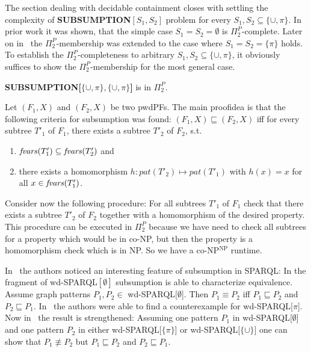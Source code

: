 The section dealing with decidable containment closes with settling the
complexity of \textbf{SUBSUMPTION$[S_1,S_2]$} problem for every $S_1, S_2 \subseteq \{
\cup, \pi \}$. In prior work \cite{letelier2012static} it was shown, that the simple case
$S_1=S_2=\emptyset$ is $\Pi_2^P$-complete. 
Later on in~\cite{letelier2013static} the $\Pi^P_2$-membership 
was extended to the case where $S_1 = S_2 = \{\pi\}$ holds.
To establish the $\Pi^P_2$-completeness to arbitrary $S_1,S_2 \subseteq \{ \cup,
\pi \}$, it obviously suffices to show the $\Pi_2^P$-membership for the most general case.

\begin{theorem}\label{scuppicuppi}
	\textbf{SUBSUMPTION[$\{\cup,\pi\}, \{ \cup, \pi \}$]} is in $\Pi^P_2$.
\end{theorem}
\begin{proofidea}
	Let $(F_1,X)$ and $(F_2,X)$ be two pwdPFs.
	The main proofidea is that the following criteria for subsumption was found:
	$(F_1,X) \sqsubseteq (F_2,X)$ iff for every subtree $T'_1$ of $F_1$, there
	exists a subtree $T'_2$ of $F_2$, s.t.
	\begin{enumerate}
		\item $\mathit{fvars}(T'_1) \subseteq \mathit{fvars}(T'_2)$ and
		\item there exists a homomorphism $h:pat(T'_2) \mapsto pat(T'_1)$
			with $h(x)= x$ for all $x \in \mathit{fvars}(T_1')$.
	\end{enumerate}
	Consider now the following procedure:
	For all subtrees $T'_1$ of $F_1$ check that there exists a subtree $T'_2$ of
	$F_2$ together with a homomorphism of the desired property. This procedure
	can be executed in $\Pi_2^P$ because we have need to check all subtrees
	for a property which would be in co-NP, but then the property is a
	homomorphism check which is in NP. So we have a co-NP$^{\mbox{NP}}$ runtime.
\end{proofidea}

In~\cite{letelier2012static} the authors noticed an interesting feature of
subsumption in SPARQL: In the fragment of wd-SPARQL$[\emptyset]$ subsumption is
able to characterize equivalence. Assume graph patterns $P_1,P_2 \in$
wd-SPARQL[$\emptyset$]. Then $P_1 \equiv P_2$ iff $P_1 \sqsubseteq P_2$ and 
$P_2 \sqsubseteq P_1$. In~\cite{letelier2013static} the authors were able to
find a counterexample for wd-SPARQL[$\pi$]. 
Now in~\cite{pichler2014containment} the result is strengthened:
Assuming one pattern $P_1$ in wd-SPARQL[$\emptyset$] and one pattern $P_2$ in either
wd-SPARQL[$\{\pi\}$] or wd-SPARQL[$\{\cup\}$] one can show that $P_1 \not\equiv
P_2$ but $P_1 \sqsubseteq P_2$ and $P_2 \sqsubseteq P_1$.


